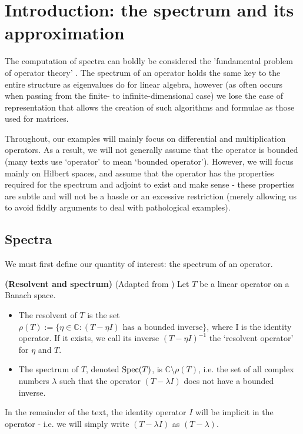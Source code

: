 \documentclass[../main.tex]{subfiles}
\begin{document}
\section{Introduction: the spectrum and its approximation}
The computation of spectra can boldly be considered the 'fundamental problem of operator theory' \parencite{arveson2002short}. The spectrum
of an operator holds the same key to the entire structure as eigenvalues do for linear algebra, however (as often occurs when passing from 
the finite- to infinite-dimensional case) we lose the ease of representation that allows the creation of such algorithms and formulae as those 
used for matrices. 

Throughout, our examples will mainly focus on differential and multiplication operators. As a result, we will not generally assume that the operator is bounded (many texts use `operator' to mean `bounded operator'). However, we will focus mainly on
Hilbert spaces, and assume that the operator has the properties required for the spectrum and adjoint to exist and make sense - these properties are subtle and will not be a hassle or an excessive restriction (merely allowing us to avoid fiddly arguments to deal with pathological examples).
\subsection{Spectra}

We must first define our quantity of interest: the spectrum of an operator.
\begin{definition}{\textbf{(Resolvent and spectrum)}}
(Adapted from \parencite{edmunds2018spectral}) Let $T$ be a linear operator on a Banach space.
\begin{itemize}
\item The resolvent of $T$ is the set $\rho(T) := \{\eta \in \mathbb{C} : (T - \eta I)\text{ has a bounded inverse}\}$, where I is the identity operator. 
If it exists, we call its inverse $(T - \eta I)^{-1}$ the `resolvent operator' for $\eta$ and $T$.
\item The spectrum of $T$, denoted $\mathrm{Spec}(T)$, is $\mathbb{C} \setminus \rho(T)$, i.e. the set of all complex numbers $\lambda$ such 
that the operator $(T - \lambda I)$ does not have a bounded inverse.
\end{itemize}
\end{definition}

In the remainder of the text, the identity operator $I$ will be implicit in the operator - i.e. we will simply write $(T - \lambda I)$ as $(T - \lambda)$.
\end{document}
